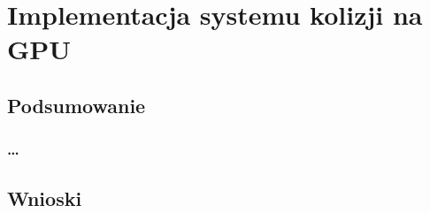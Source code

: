 \chapter{Implementacja systemu kolizji na GPU}
\label{t:int}

\section{Podsumowanie}
\label{t:int:stateofart}

	\subsection{\dots}

\section{Wnioski}